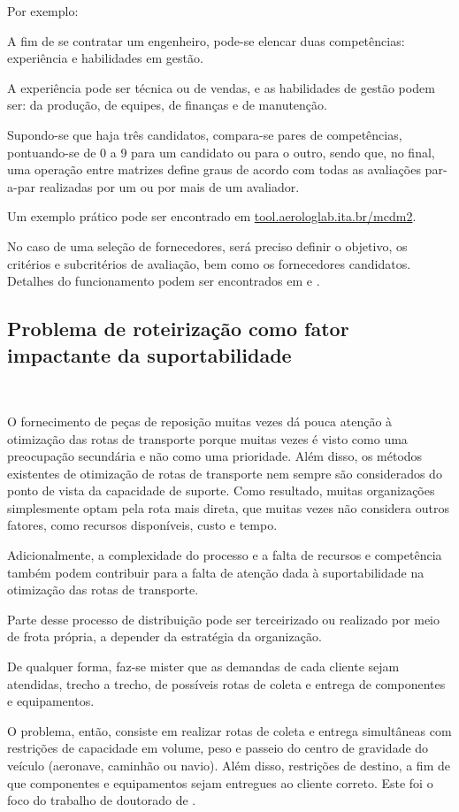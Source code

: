 \documentclass{abntex2}
\begin{document}
\begin{sloppypar}
Por exemplo:

A fim de se contratar um engenheiro, pode-se elencar duas competências: experiência e habilidades em gestão.

A experiência pode ser técnica ou de vendas, e as habilidades de gestão podem ser: da produção, de equipes, de finanças e de manutenção.

Supondo-se que haja três candidatos, compara-se pares de competências, pontuando-se de 0 a 9 para um candidato ou para o outro, sendo que, no final, uma operação entre matrizes define graus de acordo com todas as avaliações par-a-par realizadas por um ou por mais de um avaliador.

Um exemplo prático pode ser encontrado em \url{tool.aerologlab.ita.br/mcdm2}.

No caso de uma seleção de fornecedores, será preciso definir o objetivo, os critérios e subcritérios de avaliação, bem como os fornecedores candidatos.
Detalhes do funcionamento podem ser encontrados em \cite{Saaty:1996} e \cite{Saaty:2005}.


\subsection{Problema de roteirização como fator impactante da suportabilidade}\

O fornecimento de peças de reposição muitas vezes dá pouca atenção à otimização das rotas de transporte porque muitas vezes é visto como uma preocupação secundária e não como uma prioridade.
Além disso, os métodos existentes de otimização de rotas de transporte nem sempre são considerados do ponto de vista da capacidade de suporte. Como resultado, muitas organizações simplesmente optam pela rota mais direta, que muitas vezes não considera outros fatores, como recursos disponíveis, custo e tempo.

Adicionalmente, a complexidade do processo e a falta de recursos e competência também podem contribuir para a falta de atenção dada à suportabilidade na otimização das rotas de transporte.

Parte desse processo de distribuição pode ser terceirizado ou realizado por meio de frota própria, a depender da estratégia da organização.

De qualquer forma, faz-se mister que as demandas de cada cliente sejam atendidas, trecho a trecho, de possíveis rotas de coleta e entrega de componentes e equipamentos.

O problema, então, consiste em realizar rotas de coleta e entrega simultâneas com restrições de capacidade em volume,  peso e passeio do centro de gravidade do veículo (aeronave, caminhão ou navio). Além disso, restrições de destino, a fim de que componentes e equipamentos sejam entregues ao cliente correto. Este foi o foco do trabalho de doutorado de \cite{CelioMesquita:2023}.



\end{sloppypar}
\end{document}
